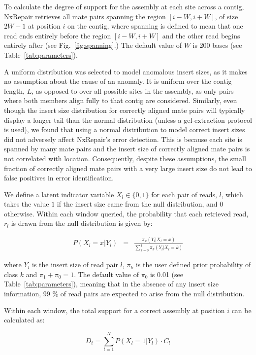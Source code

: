 To calculate the degree of support for the assembly at each site across a contig, NxRepair retrieves all mate pairs spanning the region $[i-W, i+W]$, of size $2W-1$ at position $i$ on the contig, where spanning is defined to mean that one read ends entirely before the region $[i-W, i+W]$ and the other read begins entirely after (see Fig.~\ref{fig:spanning}.) The default value of $W$ is 200 bases (see Table~\ref{tab:parameters}). 

A uniform distribution was selected to model anomalous insert sizes, as it makes no assumption about the cause of an anomaly. It is uniform over the contig length, $L$, as opposed to over all possible sites in the assembly, as only pairs where both members align fully to that contig are considered. Similarly, even though the insert size distribution for correctly aligned mate pairs will typically display a longer tail than the normal distribution (unless a gel-extraction protocol is used), we found that using a normal distribution to model correct insert sizes did not adversely affect NxRepair's error detection. This is because each site is spanned by many mate pairs and the insert size of correctly aligned mate pairs is not correlated with location. Consequently, despite these assumptions, the small fraction of correctly aligned mate pairs with a very large insert size do not lead to false positives in error identification. 

We define a latent indicator variable $X_l\in\{0,1\}$ for each pair of reads, $l$, which takes the value $1$ if the insert size came from the null distribution, and $0$ otherwise. Within each window queried, the probability that each retrieved read, $r_l$ is drawn from the null distribution is given by:

\begin{eqnarray} P(X_l=x|Y_l)& =& \frac{\pi_x(Y_l|X_l=x)}{\sum_{k=0}^1 \pi_k(Y_l|X_l=k)}
\label{eq:posterior}  
\end{eqnarray}

where $Y_l$ is the insert size of read pair $l$, $\pi_k$ is the user defined prior probability of class $k$ and $\pi_1 + \pi_0 = 1$. The default value of $\pi_0$ is 0.01 (see Table~\ref{tab:parameters}), meaning that in the absence of any insert size information, 99 \% of read pairs are expected to arise from the null distribution.  

Within each window, the total support for a correct assembly at position $i$ can be calculated as:

\begin{equation}
D_i = \sum_{l=1}^N P(X_l=1|Y_l)\cdot C_l
\end{equation}

